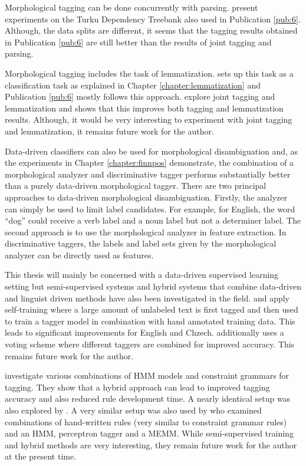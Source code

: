 Morphological tagging can be done concurrently with parsing.
\cite{Bohnet2013} present experiments on the Turku Dependency Treebank
also used in Publication \ref{pub:6}. Although, the data splits are
different, it seems that the tagging results obtained in Publication
\ref{pub:6} are still better than the results of joint tagging and
parsing.

Morphological tagging includes the task of
lemmatization. \cite{Chrupala2008} sets up this task as a
classification task as explained in Chapter
\ref{chapter:lemmatization} and Publication \ref{pub:6} mostly follows
this approach. \cite{Muller2015} explore joint tagging and
lemmatization and shows that this improves both tagging and
lemmatization results. Although, it would be very interesting to
experiment with joint tagging and lemmatization, it remains future
work for the author. 

Data-driven classifiers can also be used for morphological
disambiguation and, as the experiments in Chapter
\ref{chapter:finnpos} demonstrate, the combination of a morphological
analyzer and discriminative tagger performs substantially better than
a purely data-driven morphological tagger. There are two principal
approaches to data-driven morphological disambiguation. Firstly, the
analyzer can simply be used to limit label candidates. For example,
for English, the word ``dog'' could receive a verb label and a noun
label but not a determiner label. The second approach is to use the
morphological analyzer in feature extraction. In discriminative
taggers, the labels and label sets given by the morphological analyzer
can be directly used as features.

This thesis will mainly be con\-cer\-ned with a data-dri\-ven super\-vised
learning setting but semi-super\-vised systems and hybrid systems that
combine data-driven and linguist driven methods have also been
investigated in the field. \cite{Spoustova2009} and \cite{Sogaard2011}
apply self-training where a large amount of unlabeled text is first
tagged and then used to train a tagger model in combination with hand
annotated training data. This leads to significant improvements for
English and Chzech. \cite{Spoustova2009} additionally uses a voting
scheme where different taggers are combined for improved
accuracy. This remains future work for the author.

\cite{Hulden2012} investigate various combinations of HMM models and
constraint grammars for tagging. They show that a hybrid approach can
lead to improved tagging accuracy and also reduced rule development
time. A nearly identical setup was also explored by
\cite{Orosz2013}. A very similar setup was also used by
\cite{Spoustova2007} who examined combinations of hand-written rules
(very similar to constraint grammar rules) and an HMM, perceptron
tagger and a MEMM. While semi-supervised training and hybrid methods are very
interesting, they remain future work for the author at the present
time. %

